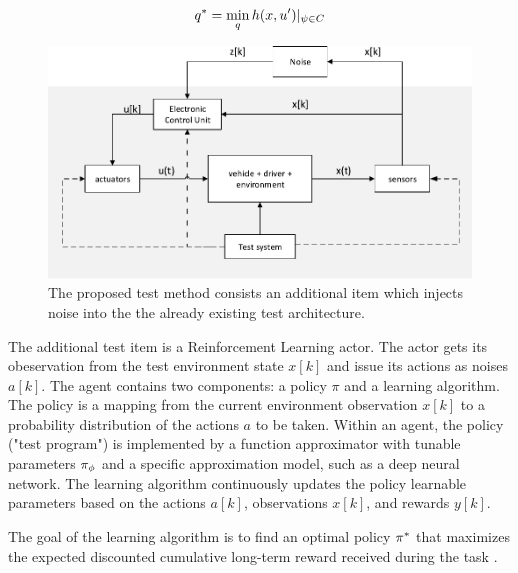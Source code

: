 \documentclass[a4paper, fleqn]{template/cas-dc}
\begin{document}
	\begin{align}
		q^* = \min_{q}h(x,u')|_{\psi \in C}
	\end{align}
	
	\begin{figure}[h]
		\begin{center}
			\includegraphics[scale=0.5]{figures/system3_.pdf}
			\caption{The proposed test method consists an additional item which injects noise into the the already existing test architecture.}
			\label{fig:system3}
		\end{center}
	\end{figure}
	
	The additional test item is a Reinforcement Learning actor. The actor gets its obeservation from the test environment state $x[k]$ and issue its actions as noises $a[k]$.
	The agent contains two components: a policy $\pi$ and a learning algorithm.
	The policy is a mapping from the current environment observation $x[k]$ to a probability distribution of the actions $a$ to be taken. Within an agent, the policy ("test program") is implemented by a function approximator with tunable parameters $\pi_{\phi}$ and a specific approximation model, such as a deep neural network.
	The learning algorithm continuously updates the policy learnable parameters based on the actions $a[k]$, observations $x[k]$, and rewards $y[k]$. 
	
	The goal of the learning algorithm is to find an optimal policy $\pi^*$ that maximizes the expected discounted cumulative long-term reward received during the task \cite{sutton1998reinforcement}.
	
\end{document}

